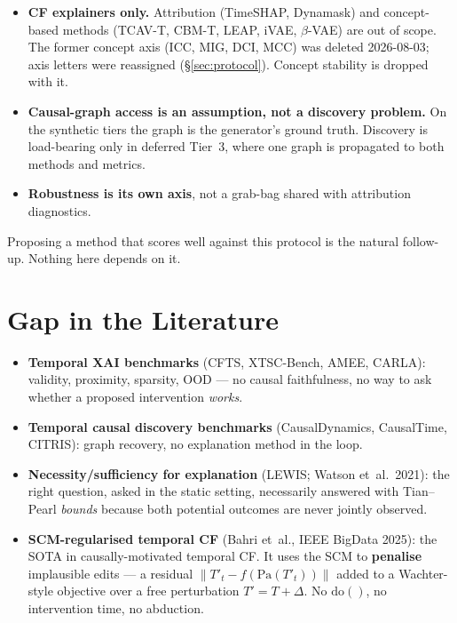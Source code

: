 \documentclass[11pt]{article}
\begin{document}
\begin{itemize}[leftmargin=*]
  \item \textbf{CF explainers only.} Attribution (TimeSHAP, Dynamask) and
        concept-based methods (TCAV-T, CBM-T, LEAP, iVAE, $\beta$-VAE) are
        out of scope. The former concept axis (ICC, MIG, DCI, MCC) was
        deleted 2026-08-03; axis letters were reassigned (\S\ref{sec:protocol}).
        Concept stability is dropped with it.
  \item \textbf{Causal-graph access is an assumption, not a discovery
        problem.} On the synthetic tiers the graph is the generator's
        ground truth. Discovery is load-bearing only in deferred Tier~3,
        where one graph is propagated to both methods and metrics.
  \item \textbf{Robustness is its own axis}, not a grab-bag shared with
        attribution diagnostics.
\end{itemize}

Proposing a method that scores well against this protocol is the natural
follow-up. Nothing here depends on it.

\section{Gap in the Literature}

\begin{itemize}[leftmargin=*]
  \item \textbf{Temporal XAI benchmarks} (CFTS, XTSC-Bench, AMEE, CARLA):
        validity, proximity, sparsity, OOD --- no causal faithfulness, no
        way to ask whether a proposed intervention \emph{works}.
  \item \textbf{Temporal causal discovery benchmarks} (CausalDynamics,
        CausalTime, CITRIS): graph recovery, no explanation method in the
        loop.
  \item \textbf{Necessity/sufficiency for explanation} (LEWIS; Watson
        et~al.\ 2021): the right question, asked in the static setting,
        necessarily answered with Tian--Pearl \emph{bounds} because both
        potential outcomes are never jointly observed.
  \item \textbf{SCM-regularised temporal CF} (Bahri et~al., IEEE BigData
        2025): the SOTA in causally-motivated temporal CF. It uses the SCM
        to \textbf{penalise} implausible edits --- a residual
        $\lVert T'_t - f(\mathrm{Pa}(T'_t))\rVert$ added to a
        Wachter-style objective over a free perturbation $T' = T + \Delta$.
        No $\mathrm{do}()$, no intervention time, no abduction.
\end{itemize}
\end{document}
